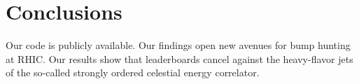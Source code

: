 \section{Conclusions}\label{sec:conclusions}

Our code is publicly available. Our findings open new avenues for bump
hunting at RHIC. Our results show that leaderboards cancel against the
heavy-flavor jets of the so-called strongly ordered celestial energy
correlator.

